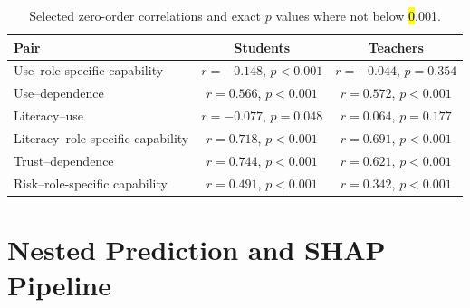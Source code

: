 \documentclass[sustainability,article,accept,moreauthors]{Definitions/mdpi}
\begin{document}
\vspace{-12pt}


\begin{table}[H]
\caption{Selected zero-order correlations and exact $p$ values where not below \hl{0}.001.}\label{tab:exactcorr}
\small

\setlength{\tabcolsep}{5.6mm}\begin{tabular}{lcc}
\toprule
\textbf{Pair} & \textbf{Students} & \textbf{Teachers}\\
\midrule
Use--role-specific capability & $r=-0.148$, $p<0.001$ & $r=-0.044$, $p=0.354$\\
Use--dependence & $r=0.566$, $p<0.001$ & $r=0.572$, $p<0.001$\\
Literacy--use & $r=-0.077$, $p=0.048$ & $r=0.064$, $p=0.177$\\
Literacy--role-specific capability & $r=0.718$, $p<0.001$ & $r=0.691$, $p<0.001$\\
Trust--dependence & $r=0.744$, $p<0.001$ & $r=0.621$, $p<0.001$\\
Risk--role-specific capability & $r=0.491$, $p<0.001$ & $r=0.342$, $p<0.001$\\
\bottomrule
\end{tabular}
\end{table}

\section{Nested Prediction and SHAP Pipeline}\label{app:ml}

\vspace{-6pt}
\end{document}
